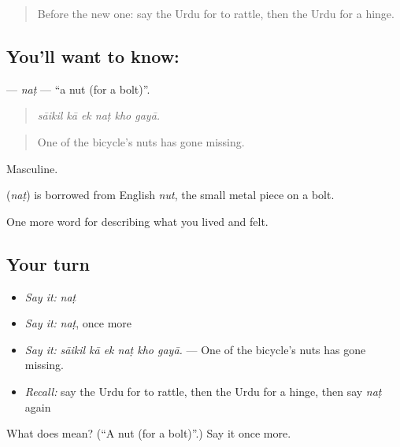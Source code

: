 \label{lesson:UR-C502-nat}



\begin{quote}
Before the new one: say the Urdu for to rattle, then the Urdu for a hinge.
\end{quote}

\subsection*{You'll want to know: }
\textbf{} — \emph{naṭ} — \textquotedblleft{}a nut (for a bolt)\textquotedblright{}.

\begin{quote}
     
\end{quote}

\begin{quote}
\emph{sāikil kā ek naṭ kho gayā.}
\end{quote}

\begin{quote}
One of the bicycle's nuts has gone missing.
\end{quote}

Masculine.

\begin{cousinweb}
\textbf{} (\emph{naṭ}) is borrowed from English \emph{nut}, the small metal piece on a bolt.
\end{cousinweb}

\begin{grammarlens}[title={What you've built}]
One more word for describing what you lived and felt.
\end{grammarlens}

\subsection*{Your turn}
\begin{itemize}
\raggedright
  \item \emph{Say it:} \emph{naṭ}
  \item \emph{Say it:} \emph{naṭ}, once more
  \item \emph{Say it:} \emph{sāikil kā ek naṭ kho gayā.} — One of the bicycle's nuts has gone missing.
  \item \emph{Recall:} say the Urdu for to rattle, then the Urdu for a hinge, then say \emph{naṭ} again
\end{itemize}

\begin{tcolorbox}[breakable,colback=teal!4,colframe=teal!35!black,title={Before you move on}]
What does  mean? (\textquotedblleft{}A nut (for a bolt)\textquotedblright{}.) Say it once more.
\end{tcolorbox}
